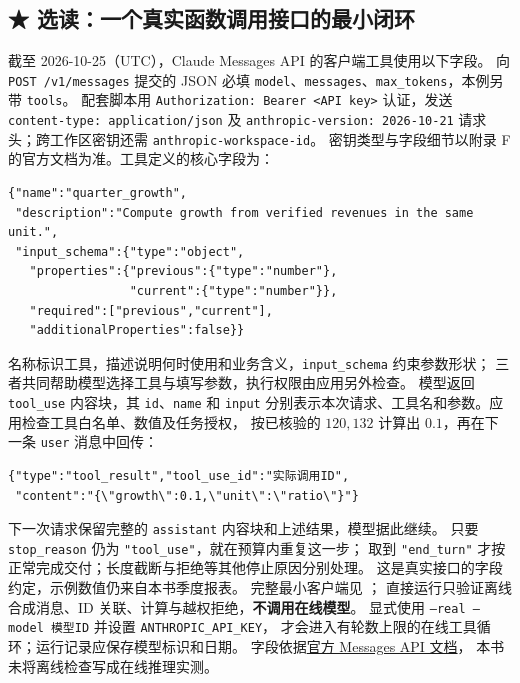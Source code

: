 \subsection{\texorpdfstring{{\symboliconfont ★}}{★} 选读：一个真实函数调用接口的最小闭环}
\label{elective:real-function-call}

截至 2026-10-25（UTC），Claude Messages API 的客户端工具使用以下字段。
向 \texttt{POST /v1/messages} 提交的 JSON 必填 \texttt{model}、\texttt{messages}、\texttt{max\_tokens}，本例另带 \texttt{tools}。
配套脚本用 \texttt{Authorization: Bearer <API key>} 认证，发送 \texttt{content-type: application/json}
及 \texttt{anthropic-version: 2026-10-21} 请求头；跨工作区密钥还需 \texttt{anthropic-workspace-id}。
密钥类型与字段细节以附录 F 的官方文档为准。工具定义的核心字段为：
\begin{Verbatim}[fontsize=\small]
{"name":"quarter_growth",
 "description":"Compute growth from verified revenues in the same unit.",
 "input_schema":{"type":"object",
   "properties":{"previous":{"type":"number"},
                 "current":{"type":"number"}},
   "required":["previous","current"],
   "additionalProperties":false}}
\end{Verbatim}
名称标识工具，描述说明何时使用和业务含义，\texttt{input\_schema} 约束参数形状；
三者共同帮助模型选择工具与填写参数，执行权限由应用另外检查。
模型返回 \texttt{tool\_use} 内容块，其 \texttt{id}、\texttt{name} 和 \texttt{input}
分别表示本次请求、工具名和参数。应用检查工具白名单、数值及任务授权，
按已核验的 $120,132$ 计算出 $0.1$，再在下一条 \texttt{user} 消息中回传：
\begin{Verbatim}[fontsize=\small]
{"type":"tool_result","tool_use_id":"实际调用ID",
 "content":"{\"growth\":0.1,\"unit\":\"ratio\"}"}
\end{Verbatim}
下一次请求保留完整的 \texttt{assistant} 内容块和上述结果，模型据此继续。
只要 \texttt{stop\_reason} 仍为 \texttt{"tool\_use"}，就在预算内重复这一步；
取到 \texttt{"end\_turn"} 才按正常完成交付；长度截断与拒绝等其他停止原因分别处理。
这是真实接口的字段约定，示例数值仍来自本书季度报表。
完整最小客户端见 ；
直接运行只验证离线合成消息、ID 关联、计算与越权拒绝，\textbf{不调用在线模型}。
显式使用 \texttt{--real --model 模型ID} 并设置 \texttt{ANTHROPIC\_API\_KEY}，
才会进入有轮数上限的在线工具循环；运行记录应保存模型标识和日期。
字段依据\href{https://platform.claude.com/docs/en/api/messages/create}{官方 Messages API 文档}，
本书未将离线检查写成在线推理实测。

